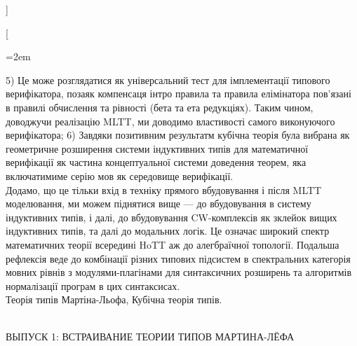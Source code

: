 \documentclass[twocolumn,10pt]{article}
\theoremstyle{definition}
\begin{document}
]

\twocolumn[

  \begin{@twocolumnfalse}

\parindent=2em
    \setmainfont{Arial}
    \fontsize{9pt}{12pt}\selectfont

5) Це може розглядатися як універсальний тест для імплементації типового верифікатора,
позаяк компенсаця інтро правила та правила елімінатора пов'язані в правилі
обчислення та рівності (бета та ета редукціях). Таким чином, доводжучи реалізацію MLTT,
ми доводимо властивості самого виконуючого верифікатора;
6) Завдяки позитивним результатм кубічна теорія була вибрана як геометричне розширення системи індуктивних типів
для математичної верифікації як частина концептуальної системи доведення теорем, яка включатимиме серію мов
як середовище верифікації.\\
Додамо, що це тільки вхід в техніку прямого вбудовування і після MLTT моделювання,
ми можем піднятися вище — до вбудовування в систему індуктивних типів, і далі,
до вбудовування CW-комплексів як зклейок вищих індуктивних типів, та далі до модальних логік.
Це означає широкий спектр математичних теорії всередині HoTT аж до алегбраїчної топології.
Подальша рефлексія веде до комбінації різних типових підсистем в спектральних категорія мовних рівнів
з модулями-плагінами для синтаксичних розширень та алгоритмів нормалізації програм в цих синтаксисах. \\
 Теорія типів Мартіна-Льофа, Кубічна теорія типів.

 \setmainfont{Arial}
    \vspace{1cm}
\fontsize{8pt}{12pt}\selectfont {}\\
    \vspace{0.1cm}
\fontsize{9pt}{12pt}\selectfont \hspace{0.53cm} ВЫПУСК 1: ВСТРАИВАНИЕ ТЕОРИИ ТИПОВ МАРТИНА-ЛЁФА

 \setmainfont{Arial}


\end{@twocolumnfalse}
\end{document}
